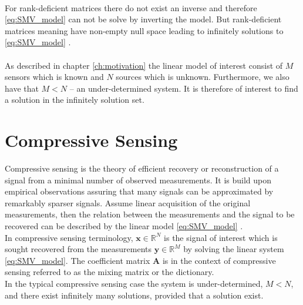 \\
For rank-deficient matrices there do not exist an inverse and therefore \eqref{eq:SMV_model} can not be solve by inverting the model. But rank-deficient matrices  meaning have non-empty null space leading to infinitely solutions to \eqref{eq:SMV_model} \cite[p. ix]{CS}.
\\ \\
As described in chapter \ref{ch:motivation} the linear model of interest consist of $M$ sensors which is known and $N$ sources which is unknown. Furthermore, we also have that $M < N$ -- an under-determined system. It is therefore of interest to find a solution in the infinitely solution set.

\section{Compressive Sensing}\label{sec:CS}
Compressive sensing is the theory of efficient recovery or reconstruction of a signal from a minimal number of observed measurements. It is build upon empirical observations assuring that many signals can be approximated by remarkably sparser signals.   
 Assume linear acquisition of the original measurements, then the relation between the measurements and the signal to be recovered can be described by the linear model \eqref{eq:SMV_model} \cite{FR}.  
\\ 
In compressive sensing terminology, $\mathbf{x}\in \mathbb{R}^{N}$ is the signal of interest which is sought recovered from the measurements $\textbf{y}\in \mathbb{R}^{M}$ by solving the linear system \eqref{eq:SMV_model}. The coefficient matrix $\textbf{A}$ is in the context of compressive sensing referred to as the mixing matrix or the dictionary.\\    
 In the typical compressive sensing case the system is under-determined, $M < N$,  and there exist infinitely many solutions, provided that a solution exist.

